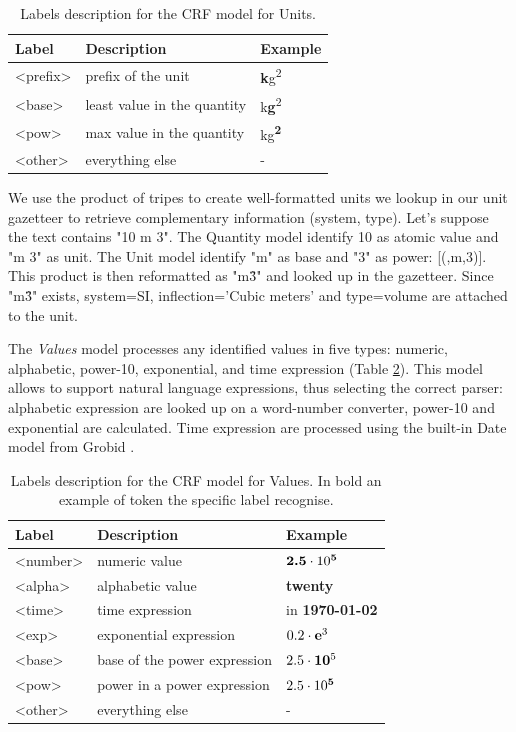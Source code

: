 \documentclass[sigconf]{acmart}
\begin{document}
\begin{table}[ht]
  \caption{Labels description for the CRF model for Units. }
  \label{tab:units-model-labels}
  \begin{tabular}{lll}
    \toprule
    Label & Description & Example\\
    \midrule
    <prefix> & prefix of the unit  & \textbf{k}g\textsuperscript{2} \\
    <base> & least value in the quantity & k\textbf{g}\textsuperscript{2}\\
    <pow> & max value in the quantity & kg\textsuperscript{\textbf{2}}\\
    <other> & everything else & - \\
  \bottomrule
\end{tabular}
\end{table}

We use the product of tripes to create well-formatted units we lookup in our unit gazetteer to retrieve complementary information (system, type). Let's suppose the text contains "10 m 3". The Quantity model identify 10 as atomic value and "m 3" as unit. The Unit model identify "m" as base and "3" as power: [(,m,3)]. This product is then reformatted as "m\^3" and looked up in the gazetteer. Since "m\^3" exists, system=SI, inflection='Cubic meters' and type=volume  are attached to the unit. 

The \textit{Values} model processes any identified values in five types: numeric, alphabetic, power-10, exponential, and time expression (Table \ref{tab:values-model-labels}). This model allows to support natural language expressions, thus selecting the correct parser: alphabetic expression are looked up on a word-number converter, power-10 and exponential are calculated. Time expression are processed using the built-in Date model from Grobid \cite{GROBID}.

\begin{table}[ht]
  \caption{Labels description for the CRF model for Values. In bold an example of token the specific label recognise.}
  \label{tab:values-model-labels}
  \begin{tabular}{lll}
    \toprule
    Label & Description & Example\\
    \midrule
    <number> & numeric value & $\textbf{2.5}\cdot10\textsuperscript{\textbf{5}}$ \\
    <alpha> & alphabetic value & \textbf{twenty} \\
    <time> & time expression  & in \textbf{1970-01-02}\\
    <exp> & exponential expression & $0.2\cdot\textbf{e}\textsuperscript{3}$ \\
    <base> & base of the power expression & $2.5\cdot\textbf{10}\textsuperscript{5}$\\
    <pow> & power in a power expression & $2.5\cdot10\textsuperscript{\textbf{5}}$ \\
    <other> & everything else & - \\
  \bottomrule
\end{tabular}
\end{table}
\end{document}
